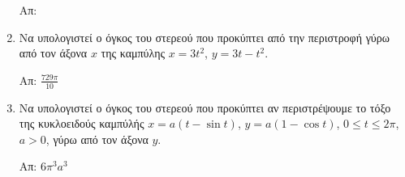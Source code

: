 \begin{enumerate}
    \hfill Απ: 

\item Να υπολογιστεί ο όγκος του στερεού που προκύπτει από την περιστροφή γύρω
	από τον άξονα $x$ της καμπύλης $ x=3t^{2} $, $ y=3t-t^{2} $.

	\hfill Απ: $ \frac{729 \pi}{10}  $

\item Να υπολογιστεί ο όγκος του στερεού που προκύπτει αν περιστρέψουμε το τόξο της κυκλοειδούς
	καμπύλής $ x = a(t - \sin{t}) $, $ y = a(1 - \cos{t}) $, $ 0\leq t\leq 2 \pi $, $ a>0 $, γύρω
	από τον άξονα $ y $.

	\hfill Απ: $ 6 \pi ^{3} a^{3}$ 
\end{enumerate}


